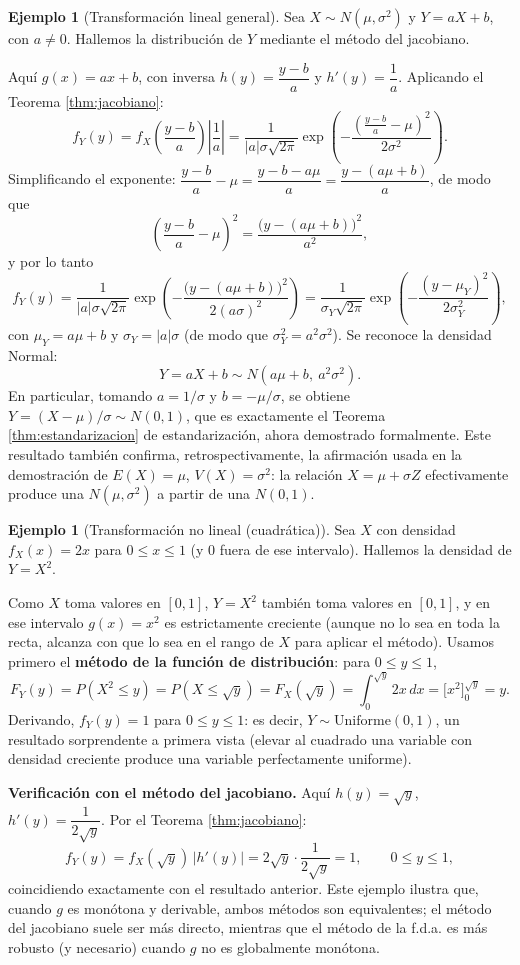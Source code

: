 \documentclass[11pt,a4paper]{article}
\theoremstyle{plain}
\theoremstyle{definition}
\newtheorem{ejemplo}[teorema]{Ejemplo}
\theoremstyle{remark}
\begin{document}
\begin{ejemplo}[Transformación lineal general]\label{ej:lineal}
Sea $X\sim N(\mu,\sigma^2)$ y $Y=aX+b$, con $a\ne0$. Hallemos la distribución de $Y$ mediante el método del jacobiano.

Aquí $g(x)=ax+b$, con inversa $h(y)=\dfrac{y-b}{a}$ y $h'(y)=\dfrac1a$. Aplicando el Teorema \ref{thm:jacobiano}:
$$f_Y(y)=f_X\!\left(\frac{y-b}{a}\right)\left|\frac1a\right|=\frac{1}{|a|\sigma\sqrt{2\pi}}\exp\left(-\frac{\left(\frac{y-b}{a}-\mu\right)^2}{2\sigma^2}\right).$$
Simplificando el exponente: $\dfrac{y-b}{a}-\mu=\dfrac{y-b-a\mu}{a}=\dfrac{y-(a\mu+b)}{a}$, de modo que
$$\left(\frac{y-b}{a}-\mu\right)^2=\frac{\big(y-(a\mu+b)\big)^2}{a^2},$$
y por lo tanto
$$f_Y(y)=\frac{1}{|a|\sigma\sqrt{2\pi}}\exp\left(-\frac{\big(y-(a\mu+b)\big)^2}{2(a\sigma)^2}\right)=\frac{1}{\sigma_Y\sqrt{2\pi}}\exp\left(-\frac{(y-\mu_Y)^2}{2\sigma_Y^2}\right),$$
con $\mu_Y=a\mu+b$ y $\sigma_Y=|a|\sigma$ (de modo que $\sigma_Y^2=a^2\sigma^2$). Se reconoce la densidad Normal:
$$Y=aX+b\sim N(a\mu+b,\ a^2\sigma^2).$$
En particular, tomando $a=1/\sigma$ y $b=-\mu/\sigma$, se obtiene $Y=(X-\mu)/\sigma\sim N(0,1)$, que es exactamente el Teorema \ref{thm:estandarizacion} de estandarización, ahora demostrado formalmente. Este resultado también confirma, retrospectivamente, la afirmación usada en la demostración de $E(X)=\mu$, $V(X)=\sigma^2$: la relación $X=\mu+\sigma Z$ efectivamente produce una $N(\mu,\sigma^2)$ a partir de una $N(0,1)$.
\end{ejemplo}

\begin{ejemplo}[Transformación no lineal (cuadrática)]
Sea $X$ con densidad $f_X(x)=2x$ para $0\le x\le1$ (y $0$ fuera de ese intervalo). Hallemos la densidad de $Y=X^2$.

Como $X$ toma valores en $[0,1]$, $Y=X^2$ también toma valores en $[0,1]$, y en ese intervalo $g(x)=x^2$ es estrictamente creciente (aunque no lo sea en toda la recta, alcanza con que lo sea en el rango de $X$ para aplicar el método). Usamos primero el \textbf{método de la función de distribución}: para $0\le y\le1$,
$$F_Y(y)=P(X^2\le y)=P(X\le\sqrt y)=F_X(\sqrt y)=\int_0^{\sqrt y}2x\,dx=\big[x^2\big]_0^{\sqrt y}=y.$$
Derivando, $f_Y(y)=1$ para $0\le y\le1$: es decir, $Y\sim\text{Uniforme}(0,1)$, un resultado sorprendente a primera vista (elevar al cuadrado una variable con densidad creciente produce una variable perfectamente uniforme).

\textbf{Verificación con el método del jacobiano.} Aquí $h(y)=\sqrt y$, $h'(y)=\dfrac{1}{2\sqrt y}$. Por el Teorema \ref{thm:jacobiano}:
$$f_Y(y)=f_X(\sqrt y)\,|h'(y)|=2\sqrt y\cdot\frac{1}{2\sqrt y}=1,\qquad 0\le y\le1,$$
coincidiendo exactamente con el resultado anterior. Este ejemplo ilustra que, cuando $g$ es monótona y derivable, ambos métodos son equivalentes; el método del jacobiano suele ser más directo, mientras que el método de la f.d.a. es más robusto (y necesario) cuando $g$ no es globalmente monótona.
\end{ejemplo}
\end{document}
